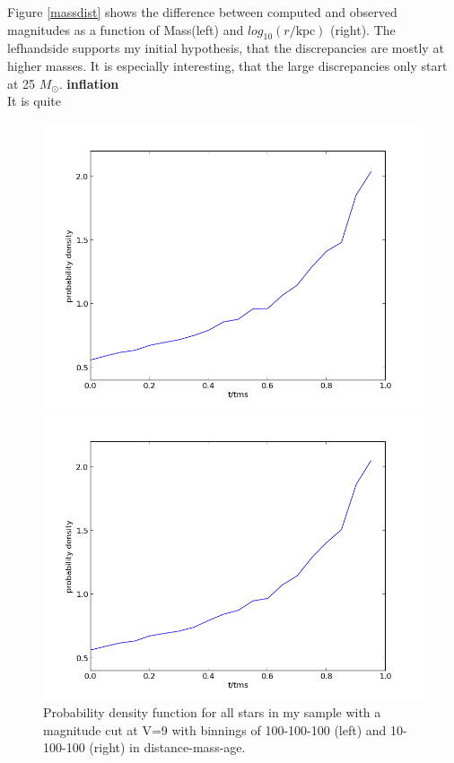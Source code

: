 \documentclass[a4paper,10pt]{article}
\begin{document}
 Figure \ref{massdist} shows the difference between computed and observed magnitudes as a function of Mass(left) and 
 $log_{10}(r/\mathrm{kpc})$ (right). The lefhandside supports my initial hypothesis, that the discrepancies are mostly at higher masses. 
 It is especially interesting, that the large discrepancies only start at 25 $M_\odot$. \textbf{inflation}\\
 It is quite 
 
 
 
 \begin{figure}[h!]
  \begin{minipage}{0.49\textwidth}
   \includegraphics[width=\textwidth]{100-100-100}
  \end{minipage}
  \begin{minipage}{0.49\textwidth}
   \includegraphics[width=\textwidth]{10-100-100}
  \end{minipage}
   \caption{Probability density function for all stars in my sample with a magnitude cut at V=9 with binnings of
 100-100-100 (left) and 10-100-100 (right) in distance-mass-age.\label{100-100-100}}
 \end{figure}
\end{document}
